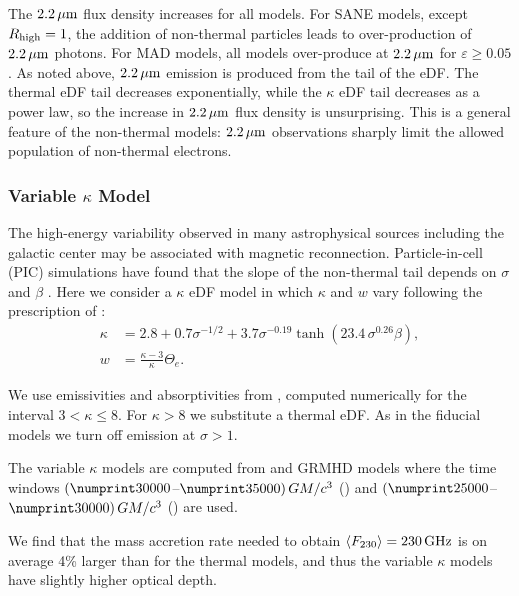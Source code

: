 
The $2.2\,\mu\mathrm{m}$ flux density increases for all models.
For SANE models, except $R_\mathrm{high}=1$, the addition of non-thermal particles leads to over-production of $2.2\,\mu\mathrm{m}$ photons.
For MAD models, all models over-produce at $2.2\,\mu\mathrm{m}$ for $\varepsilon \ge 0.05$.
As noted above, $2.2\,\mu\mathrm{m}$ emission is produced from the tail of the eDF.
The thermal eDF tail decreases exponentially, while the $\kappa$ eDF tail decreases as a power law, so the increase in $2.2\,\mu\mathrm{m}$ flux density is unsurprising.
This is a general feature of the non-thermal models: $2.2\,\mu\mathrm{m}$ observations sharply limit the allowed population of non-thermal electrons.

\subsubsection{Variable \texorpdfstring{$\kappa$}{kappa} Model}

The high-energy variability observed in many astrophysical sources including the galactic center may be associated with
magnetic reconnection.
Particle-in-cell (PIC) simulations have found that the slope of the non-thermal tail depends on  $\sigma$ and $\beta$ \citep[see, e.g.,][]{2018ApJ...862...80B}.  Here we consider a $\kappa$ eDF model in which $\kappa$ and $w$ vary  following the prescription of \cite{2018ApJ...862...80B}:
\begin{align}
  \kappa &= 2.8 +0.7\sigma^{-1/2} + 3.7\sigma^{-0.19}\tanh{(23.4\,\sigma^{0.26}\beta)}, \label{eq:kappa}\\
  w      &= \frac{ \kappa -3 }{\kappa} \Theta_e.
\end{align}

We use emissivities and absorptivities from  \cite{2016ApJ...822...34P}, computed numerically for the interval $3 < \kappa \le 8$.
For $\kappa > 8$ we substitute a thermal eDF.
As in the fiducial models we turn off emission at $\sigma > 1$.

The variable $\kappa$ models are computed from \hamr and \bhac GRMHD models where the time windows
$(\no{30000}$--$\no{35000})\,\tg$ (\hamr) and
$(\no{25000}$--$\no{30000})\,\tg$ (\bhac) are used.

We find that the mass accretion rate needed to obtain $\langle F_{230} \rangle = 230\,\mathrm{GHz}$ is on average 4\% larger than for the thermal models, and thus the variable $\kappa$ models have slightly higher optical depth.

